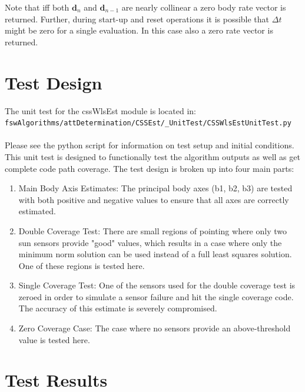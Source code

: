 \documentclass[]{BasiliskReportMemo}
\begin{document}
Note that iff both $\bm d_{n}$ and $\bm d_{n-1}$ are nearly collinear a zero body rate vector is returned.  Further, during start-up and reset operations it is possible that $\Delta t$ might be zero for a single evaluation.  In this case also a zero rate vector is returned.  
 


\section{Test Design}
The unit test for the cssWlsEst module is located in:\\

\noindent
{\tt fswAlgorithms/attDetermination/CSSEst/\_UnitTest/CSSWlsEstUnitTest.py} \\
\\

Please see the python script for information on test setup and initial 
conditions.  \\

\noindent This unit test is designed to functionally test the algorithm 
outputs as well as get complete code path coverage.  The test design is broken 
up into four main parts:\\
\begin{enumerate}
\item{Main Body Axis Estimates: The principal body axes (b1, b2, b3) are tested 
   with both positive and negative values to ensure that all axes are correctly 
   estimated.}
\item{Double Coverage Test: There are small regions of pointing where only two 
   sun sensors provide "good" values, which results in a case where only the 
   minimum norm solution can be used instead of a full least squares solution.  
   One of these regions is tested here.}
\item{Single Coverage Test: One of the sensors used for the double coverage test 
   is zeroed in order to simulate a sensor failure and hit the single coverage 
   code.  The accuracy of this estimate is severely compromised.}
\item{Zero Coverage Case: The case where no sensors provide an above-threshold 
   value is tested here.}
\end{enumerate}


\section{Test Results}
\end{document}
